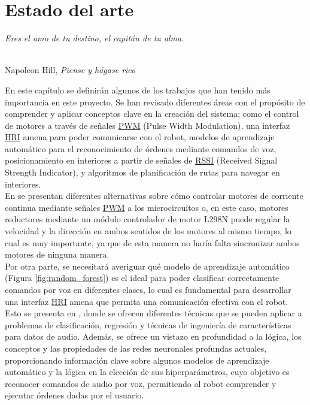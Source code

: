 \chapter{Estado del arte}
\label{cap:capitulo2}
\setcounter{page}{1}

\begin{flushright}
\begin{minipage}[]{10cm}
\emph{Eres el amo de tu destino, el capitán de tu alma.}\\
\end{minipage}\\

Napoleon Hill, \textit{Piense y hágase rico}\\
\end{flushright}

\vspace{1cm}



En este capítulo se definirán algunos de los trabajos que han tenido más importancia en este proyecto. Se han revisado diferentes áreas con el propósito de comprender y aplicar conceptos clave en la creación del sistema; como el control de motores a través de señales \hyperlink{PWM}{PWM} (Pulse Width Modulation), una interfaz \hyperlink{HRI}{HRI} amena para poder comunicarse con el robot, modelos de aprendizaje automático para el reconocimiento de órdenes mediante comandos de voz, posicionamiento en interiores a partir de señales de \hyperlink{RSSI}{RSSI} (Received Signal Strength Indicator), y algoritmos de planificación de rutas para navegar en interiores.\\


En \cite{9815716} se presentan diferentes alternativas sobre cómo controlar motores de corriente continua mediante señales \hyperlink{PWM}{PWM} a los microcircuitos o, en este caso, motores reductores mediante un módulo controlador de motor L298N puede regular la velocidad y la dirección en ambos sentidos de los motores al mismo tiempo, lo cual es muy importante, ya que de esta manera no haría falta sincronizar ambos motores de ninguna manera.\\

Por otra parte, se necesitará averiguar qué modelo de aprendizaje automático (Figura \ref{fig:random_forest}) es el ideal para poder clasificar correctamente comandos por voz en diferentes clases, lo cual es fundamental para desarrollar una interfaz \hyperlink{HRI}{HRI} amena que permita una comunicación efectiva con el robot. Esto se presenta en \cite{Zenkov-sklearn-SER-basics}, donde se ofrecen diferentes técnicas que se pueden aplicar a problemas de clasificación, regresión y técnicas de ingeniería de características para datos de audio. Además, se ofrece un vistazo en profundidad a la lógica, los conceptos y las propiedades de las redes neuronales profundas actuales, proporcionando información clave sobre algunos modelos de aprendizaje automático y la lógica en la elección de sus hiperparámetros, cuyo objetivo es reconocer comandos de audio por voz, permitiendo al robot comprender y ejecutar órdenes dadas por el usuario.\\

